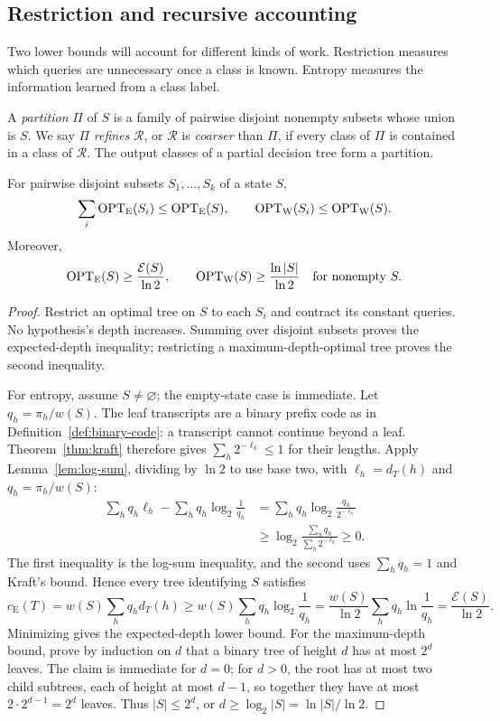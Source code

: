 \subsection{Restriction and recursive accounting}

Two lower bounds will account for different kinds of work.
Restriction measures which queries are unnecessary once a class
is known. Entropy measures the information learned from a class label.

\begin{definition}\label{def:partitions}
A \emph{partition} $\Pi$ of $S$ is a family of pairwise disjoint
nonempty subsets whose union is $S$. We say $\Pi$ \emph{refines}
$\mathcal R$, or $\mathcal R$ is \emph{coarser} than $\Pi$, if
every class of $\Pi$ is contained in a class of $\mathcal R$.
The output classes of a partial decision tree form a partition.
\end{definition}

\begin{lemma}\label{lem:restriction}
For pairwise disjoint subsets $S_1,\ldots,S_k$ of a state $S$,
\[
 \sum_i \operatorname{OPT}_{\mathrm E}(S_i)\le \operatorname{OPT}_{\mathrm E}(S),\qquad
 \operatorname{OPT}_{\mathrm W}(S_i)\le \operatorname{OPT}_{\mathrm W}(S).
\]
Moreover,
\[
 \operatorname{OPT}_{\mathrm E}(S)\ge\frac{\mathcal E(S)}{\ln2},
 \qquad
 \operatorname{OPT}_{\mathrm W}(S)\ge\frac{\ln|S|}{\ln2}
 \quad\text{for nonempty }S.
\]
\end{lemma}
\begin{proof}
Restrict an optimal tree on $S$ to each $S_i$ and contract its constant
queries. No hypothesis's depth increases. Summing over disjoint
subsets proves the expected-depth inequality; restricting a
maximum-depth-optimal tree proves the second inequality.

For entropy, assume $S\ne\varnothing$; the empty-state case is
immediate. Let $q_h=\pi_h/w(S)$. The leaf transcripts are a binary
prefix code as in Definition~\ref{def:binary-code}: a transcript
cannot continue beyond a leaf. Theorem~\ref{thm:kraft} therefore
gives $\sum_h2^{-\ell_h}\le1$ for their lengths.
Apply Lemma~\ref{lem:log-sum}, dividing by $\ln2$ to use base two, with
$\ell_h=d_T(h)$ and $q_h=\pi_h/w(S)$:
\[
 \begin{aligned}
 \sum_h q_h\ell_h-\sum_hq_h\log_2\frac1{q_h}
 &=\sum_hq_h\log_2\frac{q_h}{2^{-\ell_h}}\\
 &\ge \log_2\frac{\sum_hq_h}{\sum_h2^{-\ell_h}}
 \ge0.
 \end{aligned}
\]
The first inequality is the log-sum inequality, and the second uses
$\sum_hq_h=1$ and Kraft's bound. Hence every tree identifying $S$
satisfies
\[
 c_{\mathrm E}(T)=w(S)\sum_hq_hd_T(h)
 \ge w(S)\sum_hq_h\log_2\frac1{q_h}
 =\frac{w(S)}{\ln2}\sum_hq_h\ln\frac1{q_h}
 =\frac{\mathcal E(S)}{\ln2}.
\]
Minimizing gives the expected-depth lower bound.
For the maximum-depth bound, prove by induction on $d$ that a binary
tree of height $d$ has at most $2^d$ leaves. The claim is immediate
for $d=0$; for $d>0$, the root has at most two child subtrees, each
of height at most $d-1$, so together they have at most
$2\cdot2^{d-1}=2^d$ leaves. Thus $|S|\le2^d$, or
$d\ge\log_2|S|=\ln|S|/\ln2$.
\end{proof}

